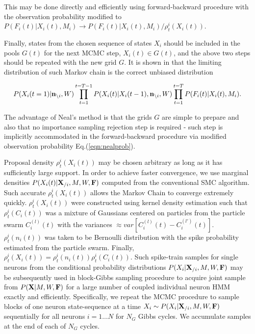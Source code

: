 This may be done directly and efficiently using forward-backward procedure with the observation probability modified to $P(F_i(t)|X_i(t), M_i)\rightarrow P(F_i(t)|X_i(t), M_i)/{\rho^i_t(X_i(t))}$.

Finally, states from the chosen sequence of states $X_i$ should be included in the pools $G(t)$ for the next MCMC step, $X_i(t)\in G(t)$, and the above two steps should be repeated with the new grid $G$. It is shown in \cite{NBR03} that the limiting distribution of such Markov chain is the correct unbiased distribution

\begin{equation}
P(X_i(t=1)|{\bf n}_{\backslash i}, W)\prod\limits_{t=1}^{t=T-1}P(X_i(t)|X_i(t-1), {\bf n}_{\backslash i}, W)\prod\limits_{t=1}^{t=T}P(F_i(t)|X_i(t), M_i).
\end{equation}

The advantage of Neal's method is that the grids $G$ are simple to prepare and also that no importance sampling rejection step is required - such step is implicitly accommodated in the forward-backward procedure via modified observation probability Eq.(\ref{eqn:nealprob}).

Proposal density $\rho^i_t(X_i(t))$ may be chosen arbitrary as long as it has sufficiently large support.  In order to achieve faster convergence, we use marginal densities $P(X_i(t)|{\bf X}_{/i}, M, W, {\bf F})$ computed from the conventional SMC algorithm. Such accurate $\rho^i_t(X_i(t))$ allows the Markov Chain to converge extremely quickly.  $\rho^i_t(X_i(t))$ were constructed using kernel density estimation such that $\rho^i_t(C_i(t))$ was a mixture of Gaussians centered on particles from the particle swarm $C_i^{(l)}(t)$ with the variances $\approx var\left[C_i^{(l)}(t)-C_i^{(l')}(t) \right]$. $\rho^i_t(n_i(t))$ was taken to be Bernoulli distribution with the spike probability estimated from the particle swarm. Finally, $\rho^i_t(X_i(t)) = \rho^i_t(n_i(t)) \rho^i_t(C_i(t))$.  Such spike-train samples for single neurons from the conditional probability distributions $P(X_i|{\bf X}_{/i}, M, W, {\bf F})$ may be subsequently used in block-Gibbs sampling procedure to acquire joint sample from $P({\bf X}|M, W, {\bf F})$ for a large number of coupled individual neuron HMM exactly and efficiently.  Specifically, we repeat the MCMC procedure to sample blocks of one neuron state-sequence at a time $X_i\sim P(X_{i}|{\bf X}_{/i}, M, W, {\bf F})$ sequentially for all neurons $i=1\ldots N$ for $N_G$ Gibbs cycles.  We accumulate samples at the end of each of $N_G$ cycles.

